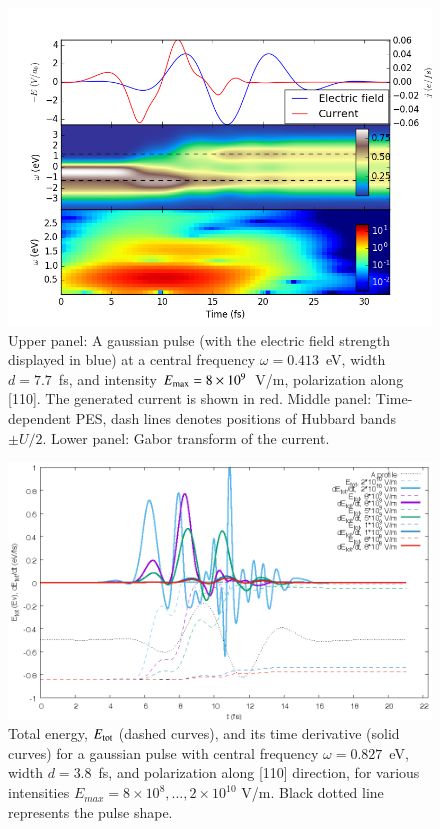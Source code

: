 
\begin{figure}
 \includegraphics[width=0.5\linewidth,angle=0]{figures/HHGw04lco8e9u25.png}
\caption{Upper panel: A gaussian pulse 
(with the electric field strength displayed in blue) at a central frequency $\omega=0.413$~eV, width $d=7.7$~fs, and intensity $E_{\rm max}=8\times10^{9}$~V/m, polarization along [110].  The generated current is shown in red.  Middle panel: Time-dependent PES, dash lines denotes positions of Hubbard bands $\pm U/2$. Lower panel: Gabor transform of the current. }
\label{HHGw04lco8e9u25}  
\end{figure}

\begin{figure}
 \includegraphics[width=0.5\linewidth,angle=0]{figures/Etotw1p5a2e10u25.eps}
\caption{Total energy, $E_{\rm tot}$ (dashed curves), 
and its time derivative (solid curves) for a gaussian pulse with central frequency $\omega=0.827$~eV, width $d=3.8$~fs, and 
polarization along [110] direction, for various 
intensities 
$E_{max}=8\times10^{8}, ..., 2\times10^{10}$ V/m. 
Black dotted line represents the pulse shape.}
\label{Etotw1p5a2e10u25}  
\end{figure}
\FloatBarrier


